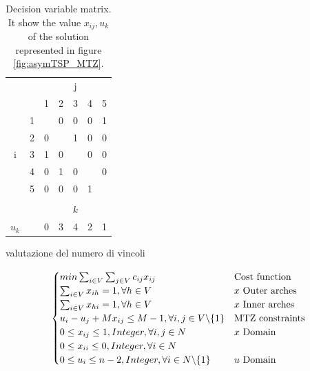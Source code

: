 \begin{table}[h!]
	\begin{center}
		\caption{Decision variable matrix. It show the value $ x_{ij}, u_k $ of the solution represented in figure \ref{fig:asymTSP_MTZ}. }
		\label{tab:asymTSP_MTZ_solution}
		\begin{tabular}{cc|c|c|c|c|c|}
			\multicolumn{2}{c}{} & \multicolumn{5}{c}{j} \\ %
			& \multicolumn{1}{c}{} & \multicolumn{1}{c}{1} & \multicolumn{1}{c}{2} & \multicolumn{1}{c}{3} & \multicolumn{1}{c}{4} & \multicolumn{1}{c}{5} \\ \cline{3-7}
			\multirow{5}{*}{i} 	& 1 & \cellcolor{Black} & 0 & 0 & 0 & 1 \\ \cline{3-7}
			& 2 & 0 & \cellcolor{Black} & 1 & 0 & 0 \\ \cline{3-7}
			& 3 & 1 & 0 & \cellcolor{Black} & 0 & 0 \\ \cline{3-7}
			& 4 & 0 & 1 & 0 & \cellcolor{Black} & 0 \\ \cline{3-7}
			& 5 & 0 & 0 & 0 & 1 & \cellcolor{Black} \\ \cline{3-7}
			\multicolumn{7}{c}{} \\ 
			
			\multicolumn{2}{c}{} & \multicolumn{5}{c}{$ k $} \\  \cline{3-7}
 			$ u_k $ &  & 0 & 3 & 4 & 2 & 1 \\ \cline{3-7}
		\end{tabular}
	\end{center}
\end{table}

valutazione del numero di vincoli 

\begin{equation}
\begin{cases}
 min \sum_{i\in V}\sum_{j\in V} c_{ij}x_{ij} & \text{Cost function} \\
 \sum_{i\in V} x_{ih} = 1, \forall h \in V  & \text{$ x $ Outer arches} \\
 \sum_{i\in V} x_{hi} = 1, \forall h \in V  & \text{$ x $ Inner arches} \\
u_i -u_j +M x_{ij} \le M - 1, \forall i,j \in V \backslash \{1\} & \text{MTZ constraints} \\
0 \le x_{ij} \le 1, Integer, \forall i,j \in N  & \text{$ x $ Domain} \\
0 \le x_{ii} \le 0, Integer, \forall i \in N  & \text{} \\
0 \le u_{i} \le n-2, Integer, \forall i \in N \backslash \{1\} & \text{$ u $ Domain} 
\end{cases}
\end{equation}

